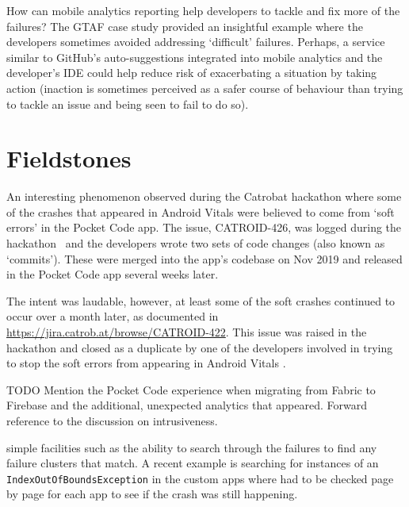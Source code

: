 How can mobile analytics reporting help developers to tackle and fix more of the failures? The GTAF case study provided an insightful example where the developers sometimes avoided addressing `difficult' failures. Perhaps, a service similar to GitHub's auto-suggestions integrated into mobile analytics and the developer's IDE could help reduce risk of exacerbating a situation by taking action (inaction is sometimes perceived as a safer course of behaviour than trying to tackle an issue and being seen to fail to do so).  




\section{Fieldstones}

An interesting phenomenon observed during the Catrobat hackathon where some of the crashes that appeared in Android Vitals were believed to come from `soft errors' in the Pocket Code app. The issue, CATROID-426, was logged during the hackathon~ and the developers wrote two sets of code changes (also known as `commits'). These were merged into the app's codebase on  Nov 2019 and released in the Pocket Code app several weeks later.

The intent was laudable, however, at least some of the soft crashes continued to occur over a month later, as documented in \url{https://jira.catrob.at/browse/CATROID-422}. This issue was raised in the hackathon and closed as a duplicate by one of the developers involved in trying to stop the soft errors from appearing in Android Vitals .

TODO Mention the Pocket Code experience when migrating from Fabric to Firebase and the additional, unexpected analytics that appeared. Forward reference to the discussion on intrusiveness.

\itools {} simple facilities such as the ability to search through the failures to find any failure clusters that match. A recent example is searching for instances of an \texttt{IndexOutOfBoundsException} in the  custom apps where  had to be checked page by page for each app to see if the crash was still happening.

